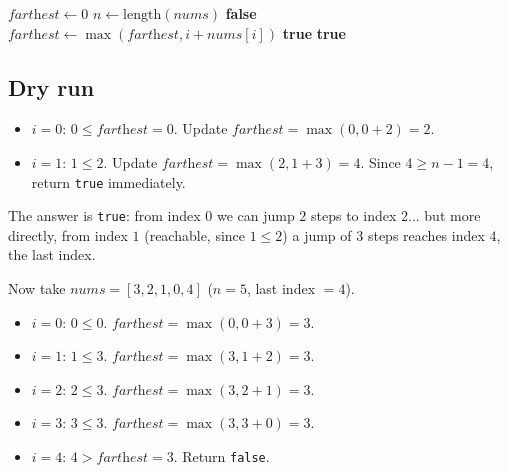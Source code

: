 \begin{algorithm}[H]
\caption{Jump Game (Reachability)}
\begin{algorithmic}[1]
  \State $\textit{farthest} \gets 0$
  \State $n \gets \text{length}(\textit{nums})$
      \State \Return \textbf{false}
    \EndIf
    \State $\textit{farthest} \gets \max(\textit{farthest}, i + \textit{nums}[i])$
      \State \Return \textbf{true}
    \EndIf
  \EndFor
  \State \Return \textbf{true}
\EndProcedure
\end{algorithmic}
\end{algorithm}

\subsection*{Dry run}


\begin{itemize}
  \item $i=0$: $0 \le \textit{farthest}=0$. Update
        $\textit{farthest} = \max(0, 0+2) = 2$.
  \item $i=1$: $1 \le 2$. Update
        $\textit{farthest} = \max(2, 1+3) = 4$. Since $4 \ge n-1 = 4$,
        return \texttt{true} immediately.
\end{itemize}

The answer is \texttt{true}: from index $0$ we can jump $2$ steps to index
$2$... but more directly, from index $1$ (reachable, since $1 \le 2$) a jump
of $3$ steps reaches index $4$, the last index.

Now take $\textit{nums} = [3, 2, 1, 0, 4]$ ($n=5$, last index $=4$).

\begin{itemize}
  \item $i=0$: $0 \le 0$. $\textit{farthest} = \max(0, 0+3) = 3$.
  \item $i=1$: $1 \le 3$. $\textit{farthest} = \max(3, 1+2) = 3$.
  \item $i=2$: $2 \le 3$. $\textit{farthest} = \max(3, 2+1) = 3$.
  \item $i=3$: $3 \le 3$. $\textit{farthest} = \max(3, 3+0) = 3$.
  \item $i=4$: $4 > \textit{farthest}=3$. Return \texttt{false}.
\end{itemize}

